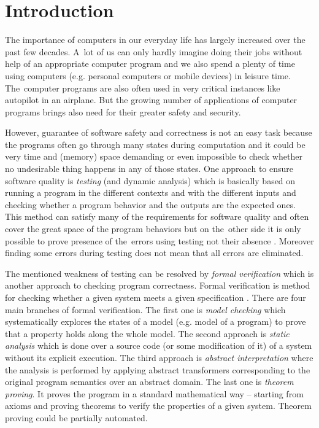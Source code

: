 \documentclass[fleqn,11pt]{ExcelAtFIT} %
\affiliation{*%
  \href{mailto:xhrusk16@stud.fit.vutbr.cz}{xhrusk16@stud.fit.vutbr.cz},
  \textit{Faculty of Information Technology, Brno University of Technology}}
\begin{document}
\startdocument



\section{Introduction}

The importance of computers in our everyday life has largely increased over the past few decades.
A~lot of us can only hardly imagine doing their jobs without help of an appropriate computer program
and we also spend a plenty of time using computers (e.g. personal computers or mobile devices) in leisure time.
The~computer programs are also often used in very critical instances like autopilot in an airplane.
But the growing number of applications of computer programs brings also need for their greater safety and security.

However, guarantee of software safety and correctness is not an easy task
because the programs often go through many states during computation
and it could be very time and (memory) space demanding or even impossible to check whether no undesirable thing
happens in any of those states.
One approach to ensure software quality is \emph{testing} (and dynamic analysis) which is basically based
on running a program in the different contexts and with the different inputs
and checking whether a program behavior and the outputs are the expected ones.
This method can satisfy many of the requirements for software quality and often cover the great space of the program behaviors
but on the~other side it is only possible to prove presence of the~errors using testing not their absence \cite{dijkstra}.
Moreover finding some errors during testing does not mean that all errors are eliminated.

The mentioned weakness of testing can be resolved by \emph{formal verification}
which is another approach to checking program correctness.
Formal verification is method for checking whether a given system meets a given specification \cite{fav:lecture}.
There are four main branches of formal verification.
The first one is \emph{model checking} which systematically explores the states of a model (e.g. model of a program) to
prove that a property holds along the whole model.
The second approach is \emph{static analysis} which is done over a source code (or some modification of it) of a system
without its explicit execution.
The third approach is \emph{abstract interpretation} where the analysis is performed by
applying abstract transformers corresponding to the original program semantics over an abstract domain.
The last one is \emph{theorem proving}.
It proves the program in a standard mathematical way -- starting from axioms and proving theorems to
verify the properties of a given system.
Theorem proving could be partially automated.
\end{document}
